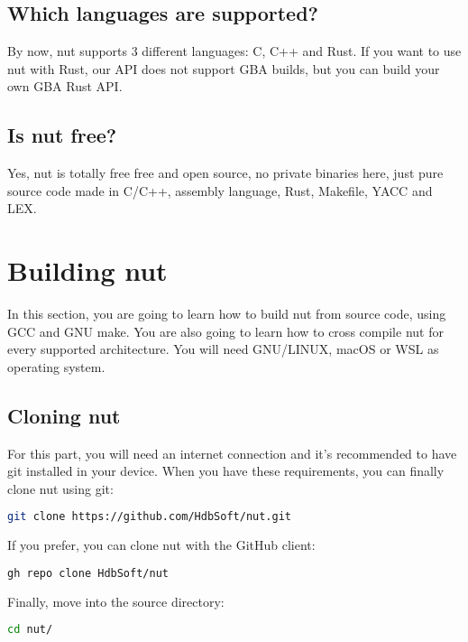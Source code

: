 \documentclass{article}
\begin{document}
  \subsection{Which languages are supported?}
  By now, nut supports 3 different languages: C, C++ and Rust. If you want to use nut with Rust, our API does not support GBA builds, but you can build your own GBA Rust API.
  \\
  \subsection{Is nut free?}
  Yes, nut is totally free free and open source, no private binaries here, just pure source code made in C/C++, assembly language, Rust, Makefile, YACC and LEX.
  \newpage

  \section{Building nut}
  In this section, you are going to learn how to build nut from source code, using GCC and GNU make. You are also going to learn how to cross compile nut for every supported architecture. You will need GNU/LINUX, macOS or WSL as operating system.
  \\
  \subsection{Cloning nut}
  For this part, you will need an internet connection and it's recommended to have git installed in your device. When you have these requirements, you can finally clone nut using git:
  \begin{lstlisting}[language=bash]
  git clone https://github.com/HdbSoft/nut.git\end{lstlisting}
  If you prefer, you can clone nut with the GitHub client:
  \begin{lstlisting}[language=bash]
  gh repo clone HdbSoft/nut\end{lstlisting}
  Finally, move into the source directory:
  \begin{lstlisting}[language=bash]
  cd nut/\end{lstlisting}
\end{document}
